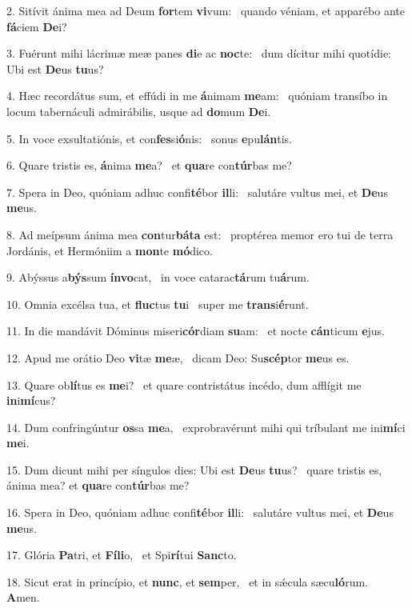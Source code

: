 2. Sitívit ánima mea ad Deum \textbf{for}tem \textbf{vi}vum: \ast\  quando véniam, et apparébo ante \textbf{fá}ciem \textbf{De}i?\

3. Fuérunt mihi lácrimæ meæ panes \textbf{di}e ac \textbf{noc}te: \ast\  dum dícitur mihi quotídie: Ubi est \textbf{De}us \textbf{tu}us?\

4. Hæc recordátus sum, et effúdi in me \textbf{á}nimam \textbf{me}am: \ast\  quóniam transíbo in locum tabernáculi admirábilis, usque ad \textbf{do}mum \textbf{De}i.\

5. In voce exsultatiónis, et con\textbf{fes}si\textbf{ó}nis: \ast\  sonus \textbf{e}pu\textbf{lán}tis.\

6. Quare tristis es, \textbf{á}nima \textbf{me}a? \ast\  et \textbf{qua}re con\textbf{túr}bas me?\

7. Spera in Deo, quóniam adhuc confi\textbf{té}bor \textbf{il}li: \ast\  salutáre vultus mei, et \textbf{De}us \textbf{me}us.\

8. Ad meípsum ánima mea \textbf{con}tur\textbf{bá}\textbf{ta} est: \ast\  proptérea memor ero tui de terra Jordánis, et Hermóniim a \textbf{mon}te \textbf{mó}dico.\

9. Abýssus a\textbf{býs}sum \textbf{ín}\textbf{vo}cat, \ast\  in voce catarac\textbf{tá}rum tu\textbf{á}rum.\

10. Omnia excélsa tua, et \textbf{fluc}tus \textbf{tu}i \ast\  super me \textbf{trans}i\textbf{é}runt.\

11. In die mandávit Dóminus miseri\textbf{cór}diam \textbf{su}am: \ast\  et nocte \textbf{cán}ticum \textbf{e}jus.\

12. Apud me orátio Deo \textbf{vi}tæ \textbf{me}æ, \ast\  dicam Deo: Su\textbf{scép}tor \textbf{me}us es.\

13. Quare ob\textbf{lí}tus es \textbf{me}i? \ast\  et quare contristátus incédo, dum afflígit me \textbf{in}i\textbf{mí}cus?\

14. Dum confringúntur \textbf{os}sa \textbf{me}a, \ast\  exprobravérunt mihi qui tríbulant me ini\textbf{mí}ci \textbf{me}i.\

15. Dum dicunt mihi per síngulos dies: Ubi est \textbf{De}us \textbf{tu}us? \ast\  quare tristis es, ánima mea? et \textbf{qua}re con\textbf{túr}bas me?\

16. Spera in Deo, quóniam adhuc confi\textbf{té}bor \textbf{il}li: \ast\  salutáre vultus mei, et \textbf{De}us \textbf{me}us.\

17. Glória \textbf{Pa}tri, et \textbf{Fí}\textbf{li}o, \ast\  et Spi\textbf{rí}tui \textbf{Sanc}to.\

18. Sicut erat in princípio, et \textbf{nunc}, et \textbf{sem}per, \ast\  et in sǽcula sæcu\textbf{ló}rum. \textbf{A}men.\

